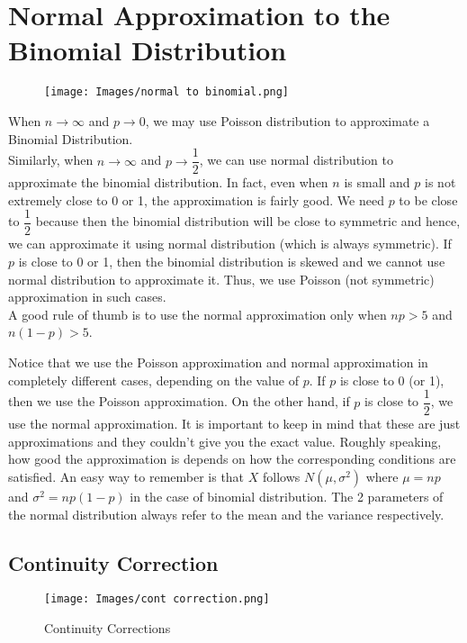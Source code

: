 \section{Normal Approximation to the Binomial Distribution}
\begin{figure}[ht]
    \centering
    \texttt{[image: Images/normal to binomial.png]}
\end{figure}
When $n \rightarrow \infty$ and $p \rightarrow 0$, we may use Poisson distribution to approximate a Binomial Distribution. \\
Similarly, when $n \rightarrow \infty$ and $p \rightarrow \dfrac{1}{2}$, we can use normal distribution to approximate the binomial distribution. In fact, even when $n$ is small and $p$ is not extremely close to 0 or 1, the approximation is fairly good. We need $p$ to be close to $\dfrac{1}{2}$ because then the binomial distribution will be close to symmetric and hence, we can approximate it using normal distribution (which is always symmetric). If $p$ is close to 0 or 1, then the binomial distribution is skewed and we cannot use normal distribution to approximate it. Thus, we use Poisson (not symmetric) approximation in such cases. \\
A good rule of thumb is to use the normal approximation only when $np > 5$ and $n(1-p) > 5$.

Notice that we use the Poisson approximation and normal approximation in completely different cases, depending on the value of $p$. If $p$ is close to  0 (or 1), then we use the Poisson approximation. On the other hand, if $p$ is close to $\dfrac{1}{2}$, we use the normal approximation. It is important to keep in mind that these are just approximations and they couldn't give you the exact value. Roughly speaking, how good the approximation is depends on how the corresponding conditions are satisfied.
An easy way to remember is that $X$ follows $N(\mu, \sigma^2)$ where $\mu = np$ and $\sigma^2 = np(1-p)$ in the case of binomial distribution. The 2 parameters of the normal distribution always refer to the mean and the variance respectively.
\subsection{Continuity Correction}
\begin{figure}[h]
    \centering
    \texttt{[image: Images/cont correction.png]}
    \caption{Continuity Corrections}
    \label{fig:my_label}
\end{figure}

